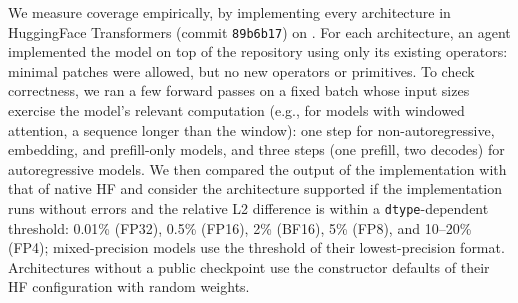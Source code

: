 We measure coverage empirically, by implementing every architecture in HuggingFace Transformers (commit \texttt{89b6b17}) on \fastkernels{}.
For each architecture, an agent implemented the model on top of the \fastkernels{} repository using only its existing operators: minimal patches were allowed, but no new operators or primitives.
To check correctness, we ran a few forward passes on a fixed batch whose input sizes exercise the model's relevant computation (e.g., for models with windowed attention, a sequence longer than the window): one step for non-autoregressive, embedding, and prefill-only models, and three steps (one prefill, two decodes) for autoregressive models.
We then compared the output of the \fastkernels{} implementation with that of native HF and consider the architecture supported if the implementation runs without errors and the relative L2 difference is within a \texttt{dtype}-dependent threshold: 0.01\% (FP32), 0.5\% (FP16), 2\% (BF16), 5\% (FP8), and 10--20\% (FP4); mixed-precision models use the threshold of their lowest-precision format.
Architectures without a public checkpoint use the constructor defaults of their HF configuration with random weights.





